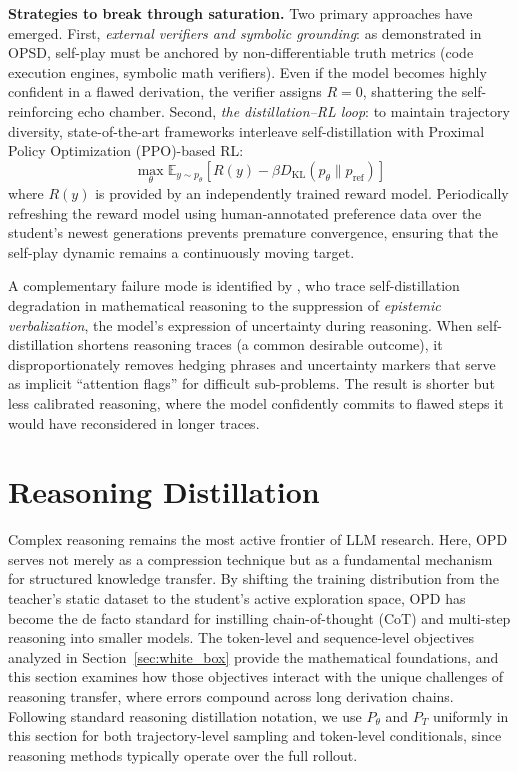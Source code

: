 \documentclass{article} %
\newcommand{\KL}{D_{\mathrm{KL}}}
\newcommand{\ptheta}{p_\theta}
\begin{document}
\textbf{Strategies to break through saturation.}
Two primary approaches have emerged. First, \emph{external verifiers and symbolic grounding}: as demonstrated in OPSD, self-play must be anchored by non-differentiable truth metrics (code execution engines, symbolic math verifiers). Even if the model becomes highly confident in a flawed derivation, the verifier assigns $R=0$, shattering the self-reinforcing echo chamber. Second, \emph{the distillation--RL loop}: to maintain trajectory diversity, state-of-the-art frameworks interleave self-distillation with Proximal Policy Optimization (PPO)-based RL:
\begin{equation}
    \max_\theta \mathbb{E}_{y \sim \ptheta} \left[ R(y) - \beta \KL(\ptheta \parallel p_{\mathrm{ref}}) \right]
\end{equation}
where $R(y)$ is provided by an independently trained reward model. Periodically refreshing the reward model using human-annotated preference data over the student's newest generations prevents premature convergence, ensuring that the self-play dynamic remains a continuously moving target.

A complementary failure mode is identified by \citet{2603.24472}, who trace self-distillation degradation in mathematical reasoning to the suppression of \emph{epistemic verbalization}, the model's expression of uncertainty during reasoning. When self-distillation shortens reasoning traces (a common desirable outcome), it disproportionately removes hedging phrases and uncertainty markers that serve as implicit ``attention flags'' for difficult sub-problems. The result is shorter but less calibrated reasoning, where the model confidently commits to flawed steps it would have reconsidered in longer traces.

\section{Reasoning Distillation}
\label{sec:reasoning}

Complex reasoning remains the most active frontier of LLM research. Here, OPD serves not merely as a compression technique but as a fundamental mechanism for structured knowledge transfer. By shifting the training distribution from the teacher's static dataset to the student's active exploration space, OPD has become the de facto standard for instilling chain-of-thought (CoT) and multi-step reasoning into smaller models. The token-level and sequence-level objectives analyzed in Section~\ref{sec:white_box} provide the mathematical foundations, and this section examines how those objectives interact with the unique challenges of reasoning transfer, where errors compound across long derivation chains. Following standard reasoning distillation notation, we use $P_\theta$ and $P_T$ uniformly in this section for both trajectory-level sampling and token-level conditionals, since reasoning methods typically operate over the full rollout.
\end{document}
